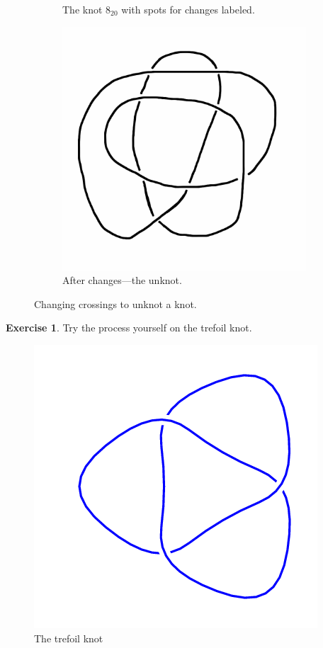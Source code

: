 \documentclass[12pt,letterpaper]{article}
\theoremstyle{definition}
\newtheorem{exercise}[question]{Exercise}
\begin{document}
\begin{figure}[h]
\begin{subfigure}{.3\textwidth}
        \caption{The knot $8_{20}$ with spots for changes labeled.}
    \end{subfigure}
    \begin{subfigure}{.3\textwidth}
        \centering
        \includegraphics[width=\textwidth]{rgp12pics/8-20-unknot.png}
        \caption{After changes---the unknot.}
    \end{subfigure}
    \caption{Changing crossings to unknot a knot.}
\end{figure}

\clearpage

\begin{exercise}
Try the process yourself on the trefoil knot.
\end{exercise}

\begin{figure}[h]
    \centering
    \includegraphics[width=.3\textwidth]{rgp12pics/3_1.png}
    \caption{The trefoil knot}
\end{figure}
\end{document}
